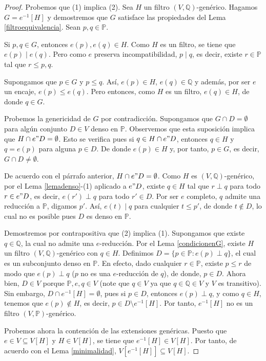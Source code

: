 \documentclass[11pt]{unam_tesis1}
\theoremstyle{MyThmStyle}
\theoremstyle{definition}
\theoremstyle{plain}
\theoremstyle{remark}
\let\leq\leqslant
\begin{document}
\begin{proof}
Probemos que (1) implica (2). Sea $H$ un filtro $(V,\mathbb Q)$-gen\'erico. Hagamos $G=e^{-1}[H]$ y demostremos que $G$ satisface las propiedades del Lema \ref{filtroequivalencia}. Sean $p,q \in \mathbb P$.

Si $p,q \in G$, entonces $e(p), e(q)\in H$. Como $H$ es un filtro, se tiene que $e(p)\mid e(q)$. Pero como $e$ preserva incompatibilidad, $p\mid q$, es decir, existe $r\in \mathbb P$ tal que $r\leq p,q$.

Supongamos que $p\in G$ y $p\leq q$. As\'i, $e(p)\in H$, $e(q)\in \mathbb Q$ y adem\'as, por ser $e$ un encaje, $e(p)\leq e(q)$. Pero entonces, como $H$ es un filtro, $e(q)\in H$, de donde $q\in G$.

Probemos la genericidad de $G$ por contradicci\'on. Supongamos que $G\cap D=\emptyset$ para alg\'un conjunto $D\in V$ denso en $\mathbb P$. Observemos que esta suposici\'on implica que $H\cap e"D=\emptyset$. Esto se verifica pues si $q\in H\cap e"D$, entonces $q\in H$ y $q=e(p)$ para alguna $p\in D$. De donde $e(p)\in H$ y, por tanto, $p\in G$, es decir, $G\cap D\neq \emptyset$.

De acuerdo con el p\'arrafo anterior, $H\cap e"D=\emptyset$. Como $H$ es $(V,\mathbb Q)$-gen\'erico, por el Lema \ref{lemadenso}-(1) aplicado a $e"D$, existe $q\in H$ tal que $r\perp q$ para todo $r\in e"D$, es decir, $e(r')\perp q$ para todo $r'\in D$. Por ser $e$ completo, $q$ admite una reducci\'on a $\mathbb P$, digamos $p'$. As\'i, $e(t)\mid q$ para cualquier $t\leq p'$, de donde $t\notin D$, lo cual no es posible pues $D$ es denso en $\mathbb P$.

Demostremos por contrapositiva que (2) implica (1).  Supongamos que existe $q\in \mathbb Q$, la cual no admite una $e$-reducci\'on. Por el Lema \ref{condicionenG}, existe $H$ un filtro $(V,\mathbb Q)$-gen\'erico con $q\in H$. Definimos $D=\{p\in \mathbb P: e(p)\perp q \}$, el cual es un subconjunto denso en $\mathbb P$. En efecto, dado cualquier $r\in \mathbb P$, existe $p\leq r$ de modo que $e(p)\perp q$ ($p$ no es una $e$-reducci\'on de $q$), de donde, $p\in D$. Ahora bien, $D\in V$ porque $\mathbb P, e, q \in V$ (note que $q \in V$ ya que $q \in \mathbb Q \in V$ y $V$ es transitivo). Sin embargo, $D\cap e^{-1}[H]=\emptyset$, pues si $p\in D$, entonces $e(p)\perp q$, y como $q \in H$, tenemos que $e(p) \notin H$, es decir, $p\in D\setminus e^{-1}[H]$. Por tanto, $e^{-1}[H]$ no es un filtro $(V,\mathbb P)$-gen\'erico.

Probemos ahora la contenci\'on de las extensiones gen\'ericas. Puesto que $e\in V\subseteq V[H]$ y $H\in V[H]$, se tiene que $e^{-1}[H]\in V[H]$. Por tanto, de acuerdo con el Lema \ref{minimalidad}, $V[e^{-1}[H]]\subseteq V[H]$.
\end{proof}
\end{document}
